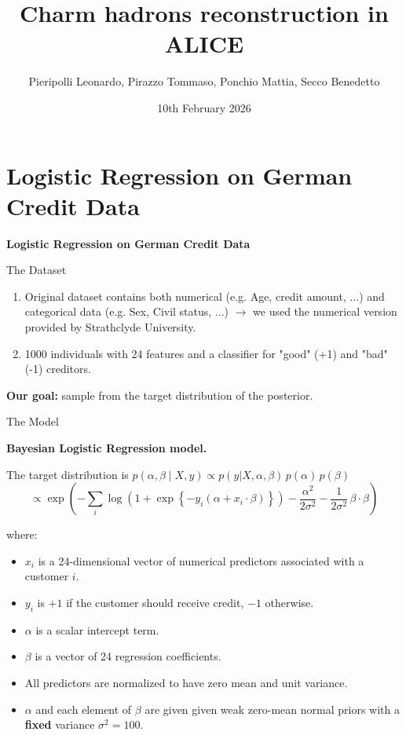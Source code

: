 \documentclass[aspectratio=43]{beamer}
\title{Charm hadrons reconstruction in ALICE\\}
\subtitle{}
\author[]{Pieripolli Leonardo, Pirazzo Tommaso, Ponchio Mattia, Secco Benedetto}
\date{10th February 2026}
\begin{document}
	\frame{\titlepage}
	\section{Logistic Regression on German Credit Data}
	\begin{frame}
		\begin{center}
			{\Huge \textbf{Logistic Regression on German Credit Data}}
		\end{center}
	\end{frame}
	\begin{frame}{The Dataset}
		\begin{enumerate}
			\item Original dataset contains both numerical (e.g. Age, credit amount, ...) and categorical data (e.g. Sex, Civil status, ...) $\rightarrow$ we used the numerical version provided by Strathclyde University.
			\item 1000 individuals with 24 features and a classifier for "good" (+1) and "bad" (-1) creditors.
		\end{enumerate}
		\begin{center}
			\textbf{Our goal:} sample from the target distribution of the posterior. 
		\end{center}
	\end{frame}
	
	\begin{frame}{The Model}
		\begin{center}
			\textbf{Bayesian Logistic Regression model.}
		\end{center}
		
		The target distribution is $p(\alpha, \beta \mid X, y) \propto p(y|X, \alpha, \beta) \, p(\alpha) \, p(\beta)$
		\begin{equation*}
			\propto \exp\left(
			-\sum_{i}\log\!\left(1+\exp\!\left\{-y_i\left(\alpha + x_i \cdot \beta\right)\right\}\right)
			-\frac{\alpha^2}{2\sigma^2}
			-\frac{1}{2\sigma^2}\,\beta \cdot \beta
			\right)
		\end{equation*}
		
		where:
		\begin{itemize}
			\item $x_i$ is a 24-dimensional vector of numerical predictors associated with a customer $i$.
			\item $y_i$ is $+1$ if the customer should receive credit, $-1$ otherwise.
			\item $\alpha$ is a scalar intercept term.
			\item $\beta$ is a vector of 24 regression coefficients.
			\item All predictors are normalized to have zero mean and unit variance.
			\item $\alpha$ and each element of $\beta$ are given given weak zero-mean normal priors with a \textbf{fixed} variance $\sigma^2 = 100$.
			
		\end{itemize}
		
	\end{frame}
	
\end{document}
